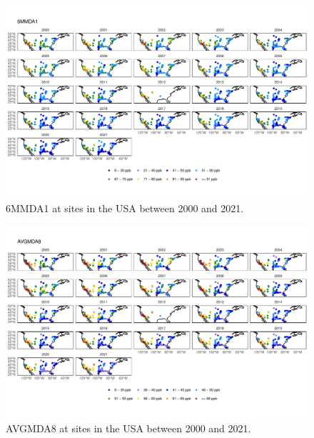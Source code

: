 \documentclass{article}
\begin{document}
\begin{figure}
\centering
\includegraphics[height=0.75\textheight]{figures/si_figures/fS20_metric_map_United-States-of-America_6MMDA1.pdf}
\caption{6MMDA1 at sites in the USA between 2000 and 2021.}
\label{si_fig:metric_map_us_6MMDA1}
\end{figure}
\clearpage

\begin{figure}
\centering
\includegraphics[height=0.75\textheight]{figures/si_figures/fS21_metric_map_United-States-of-America_AVGMDA8.pdf}
\caption{AVGMDA8 at sites in the USA between 2000 and 2021.}
\label{si_fig:metric_map_us_AVGMDA8}
\end{figure}
\clearpage


\end{document}

